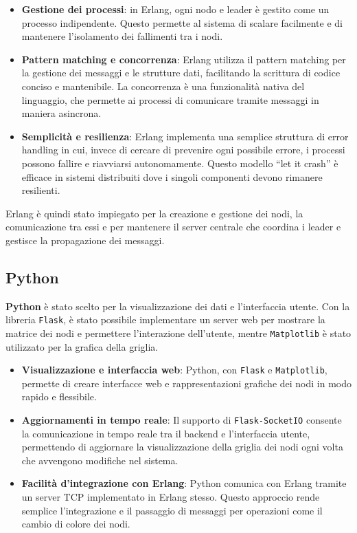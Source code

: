 \documentclass[12pt, a4paper]{report}
\begin{document}
\begin{itemize}
    \item \textbf{Gestione dei processi}: in Erlang, ogni nodo e leader è gestito come un processo indipendente. Questo permette al sistema di scalare facilmente e di mantenere l'isolamento dei fallimenti tra i nodi.
    \item \textbf{Pattern matching e concorrenza}: Erlang utilizza il pattern matching per la gestione dei messaggi e le strutture dati, facilitando la scrittura di codice conciso e mantenibile. La concorrenza è una funzionalità nativa del linguaggio, che permette ai processi di comunicare tramite messaggi in maniera asincrona.
    \item \textbf{Semplicità e resilienza}: Erlang implementa una semplice struttura di error handling in cui, invece di cercare di prevenire ogni possibile errore, i processi possono fallire e riavviarsi autonomamente. Questo modello “let it crash” è efficace in sistemi distribuiti dove i singoli componenti devono rimanere resilienti.
\end{itemize}

Erlang è quindi stato impiegato per la creazione e gestione dei nodi, la comunicazione tra essi e per mantenere il server centrale che coordina i leader e gestisce la propagazione dei messaggi.

\subsection{Python}

\textbf{Python} è stato scelto per la visualizzazione dei dati e l’interfaccia utente. Con la libreria \texttt{Flask}, è stato possibile implementare un server web per mostrare la matrice dei nodi e permettere l'interazione dell'utente, mentre \texttt{Matplotlib} è stato utilizzato per la grafica della griglia.

\begin{itemize}
    \item \textbf{Visualizzazione e interfaccia web}: Python, con \texttt{Flask} e \texttt{Matplotlib}, permette di creare interfacce web e rappresentazioni grafiche dei nodi in modo rapido e flessibile.
    \item \textbf{Aggiornamenti in tempo reale}: Il supporto di \texttt{Flask-SocketIO} consente la comunicazione in tempo reale tra il backend e l'interfaccia utente, permettendo di aggiornare la visualizzazione della griglia dei nodi ogni volta che avvengono modifiche nel sistema.
    \item \textbf{Facilità d'integrazione con Erlang}: Python comunica con Erlang tramite un server TCP implementato in Erlang stesso. Questo approccio rende semplice l'integrazione e il passaggio di messaggi per operazioni come il cambio di colore dei nodi.
\end{itemize}
\end{document}
